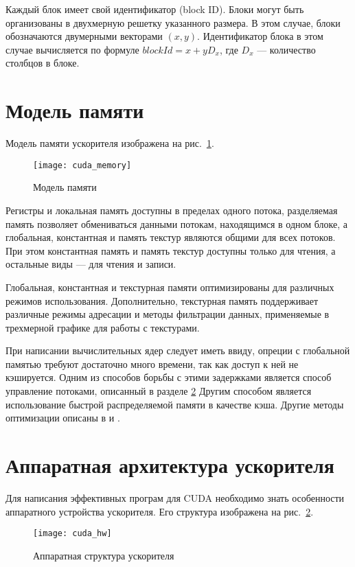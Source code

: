 Каждый блок имеет свой идентификатор (block ID). Блоки могут быть организованы в двухмерную решетку указанного размера. В этом случае, блоки обозначаются двумерными векторами $(x, y)$. Идентификатор блока в этом случае вычисляется по формуле $blockId = x + yD_x$, где $D_x$ --- количество столбцов в блоке.

\section{Модель памяти}
\label{c:mem_model}
Модель памяти ускорителя изображена на рис.~\ref{fig:cuda_memory}.

\begin{figure}[ht]
\center
\texttt{[image: cuda\_memory]}
\caption{Модель памяти}
\label{fig:cuda_memory}
\end{figure}

Регистры и локальная память доступны в пределах одного потока, разделяемая память позволяет обмениваться данными потокам, находящимся в одном блоке, а глобальная, константная и память текстур являются общими для всех потоков. При этом константная память и память текстур доступны только для чтения, а остальные виды --- для чтения и записи.

Глобальная, константная и текстурная памяти оптимизированы для различных режимов использования. Дополнительно, текстурная память поддерживает различные режимы адресации и методы фильтрации данных, применяемые в трехмерной графике для работы с текстурами.

При написании вычислительных ядер следует иметь ввиду, опреции с глобальной памятью требуют достаточно много времени, так как доступ к ней не кэшируется. Одним из способов борьбы с этими задержками является способ управление потоками, описанный в разделе \ref{c:cuda_hw} Другим способом является использование быстрой распределяемой памяти в качестве кэша. Другие методы оптимизации описаны в \cite{cuda_struct_alg} и \cite{cuda_optim}.

\section{Аппаратная архитектура ускорителя}
\label{c:cuda_hw}

Для написания эффективных програм для CUDA необходимо знать особенности аппаратного устройства ускорителя. Его структура изображена на рис.~\ref{fig:cuda_hw}.

\begin{figure}[ht]
\center
\texttt{[image: cuda\_hw]}
\caption{Аппаратная структура ускорителя}
\label{fig:cuda_hw}
\end{figure}

